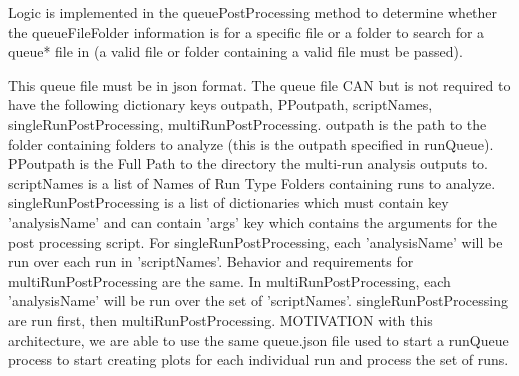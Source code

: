 \documentclass[12pt]{article}
\begin{document}
Logic is implemented in the queuePostProcessing method to determine whether the queueFileFolder information is for a specific file or a folder to search for a queue* file in (a valid file or folder containing a valid file must be passed). 

This queue file must be in json format.
The queue file CAN but is not required to have the following dictionary keys outpath, PPoutpath, scriptNames, singleRunPostProcessing, multiRunPostProcessing.
outpath is the path to the folder containing folders to analyze (this is the outpath specified in runQueue).
PPoutpath is the Full Path to the directory the multi-run analysis outputs to.
scriptNames is a list of Names of Run Type Folders containing runs to analyze.
singleRunPostProcessing is a list of dictionaries which must contain key 'analysisName' and can contain 'args' key which contains the arguments for the post processing script.
For singleRunPostProcessing, each 'analysisName' will be run over each run in 'scriptNames'.
Behavior and requirements for multiRunPostProcessing are the same.
In multiRunPostProcessing, each 'analysisName' will be run over the set of 'scriptNames'.
singleRunPostProcessing are run first, then multiRunPostProcessing.
MOTIVATION with this architecture, we are able to use the same queue.json file used to start a runQueue process to start creating plots for each individual run and process the set of runs.


\section{}

\nocite{*}

%
%
%
\end{document}
